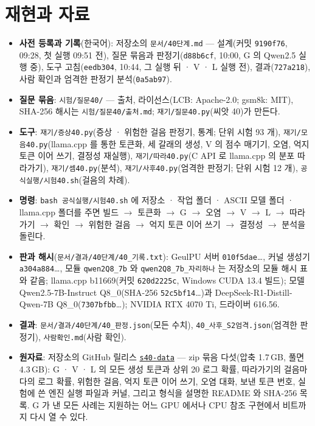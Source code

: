 \documentclass[11pt]{article}
\begin{document}
\section{재현과 자료}\label{app:repro}

\sloppy
\begin{itemize}[noitemsep]
\item \textbf{사전 등록과 기록}(한국어): 저장소의 \texttt{문서/40단계.md} --- 설계(커밋 \texttt{9190f76}, 09:28, 첫 실행 09:51
      전), 질문 묶음과 판정기(\texttt{d88b6cf}, 10:00, G 의 Qwen2.5 실행 중), 도구 고침(\texttt{eedb304}, 10:44, 그 실행 뒤 · V ·
      L 실행 전), 결과(\texttt{727a218}), 사람 확인과 엄격한 판정기 분석(\texttt{0a5ab97}).
\item \textbf{질문 묶음}: \texttt{시험/질문40/} --- 출처, 라이선스(LCB: Apache-2.0; gsm8k: MIT), SHA-256 해시는
      \texttt{시험/질문40/출처.md}; \texttt{재기/질문40.py}(씨앗 40)가 만든다.
\item \textbf{도구}: \texttt{재기/증상40.py}(증상 · 위험한 걸음 판정기, 통계; 단위 시험 93 개), \texttt{재기/모음40.py}(llama.cpp
      를 통한 토큰화, 세 갈래의 생성, V 의 점수 매기기, 오염, 억지 토큰 이어 쓰기, 결정성 재실행), \texttt{재기/따라40.py}(C API
      로 llama.cpp 의 분포 따라가기), \texttt{재기/셈40.py}(분석), \texttt{재기/사후40.py}(엄격한 판정기; 단위 시험 12 개),
      \texttt{공식실행/시험40.sh}(걸음의 차례).
\item \textbf{명령}: \texttt{bash 공식실행/시험40.sh} 에 저장소 · 작업 폴더 · ASCII 모델 폴더 · llama.cpp 폴더를 주면 빌드 $\to$
      토큰화 $\to$ G $\to$ 오염 $\to$ V $\to$ L $\to$ 따라가기 $\to$ 확인 $\to$ 위험한 걸음 $\to$ 억지 토큰 이어 쓰기 $\to$ 결정성
      $\to$ 분석을 돌린다.
\item \textbf{판과 해시}(\texttt{문서/결과/40단계/40\_기록.txt}): GeulPU 서버 \texttt{010f5dae}\dots, 커널 생성기
      \texttt{a304a884}\dots, 모듈 \texttt{qwen2Q8\_7b} 와 \texttt{qwen2Q8\_7b\_자리하나} 는 저장소의 모듈 해시 표와 같음;
      llama.cpp b11669(커밋 \texttt{620d2225c}, Windows CUDA 13.4 빌드); 모델 Qwen2.5-7B-Instruct Q8\_0(SHA-256
      \texttt{52c5bf14}\dots)과 DeepSeek-R1-Distill-Qwen-7B Q8\_0(\texttt{7307bfbb}\dots); NVIDIA RTX 4070 Ti, 드라이버 616.56.
\item \textbf{결과}: \texttt{문서/결과/40단계/40\_판정.json}(모든 수치), \texttt{40\_사후\_S2엄격.json}(엄격한 판정기),
      \texttt{사람확인.md}(사람 확인).
\item \textbf{원자료}: 저장소의 GitHub 릴리스 \href{https://github.com/wwoosshh/GeulPU/releases/tag/s40-data}{\texttt{s40-data}}
      \citep{woo2026data} --- zip 묶음 다섯(압축 1.7\,GB, 풀면 4.3\,GB): G · V · L 의 모든 생성 토큰과 상위 20 로그 확률,
      따라가기의 걸음마다의 로그 확률, 위험한 걸음, 억지 토큰 이어 쓰기, 오염 대화, 보낸 토큰 번호, 실험에 쓴 엔진 실행 파일과
      커널, 그리고 형식을 설명한 README 와 SHA-256 목록. G 가 낸 모든 사례는 지원하는 어느 GPU 에서나 CPU 참조 구현에서 비트까지
      다시 열 수 있다.
\end{itemize}
\end{document}
